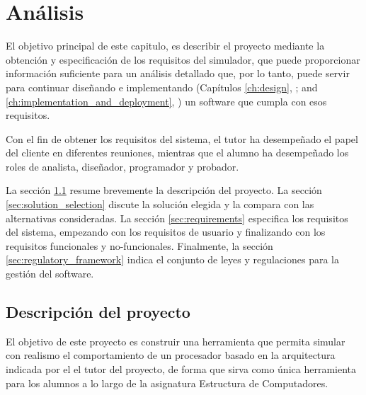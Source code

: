 \chead[]{}
\renewcommand{\headrulewidth}{0.5pt}

\lfoot[]{}
\cfoot[]{}
\rfoot[]{}
\renewcommand{\footrulewidth}{0pt}

\chapter{Análisis}
\label{ch:analysis}

El objetivo principal de este capitulo, es describir el proyecto mediante la obtención y especificación de los requisitos del simulador, que puede proporcionar información suficiente para un análisis detallado que, por lo tanto, puede servir para continuar diseñando e implementando (Capítulos \ref{ch:design}, \textit{}; and \ref{ch:implementation_and_deployment}, \textit{}) un software que cumpla con esos requisitos. 

Con el fin de obtener los requisitos del sistema, el tutor ha desempeñado el papel del cliente en diferentes reuniones, mientras que el alumno ha desempeñado los roles de analista, diseñador, programador y probador.

La sección \ref{sec:project_description} resume brevemente la descripción del proyecto. La sección \ref{sec:solution_selection} discute la solución elegida y la compara con las alternativas consideradas. La sección \ref{sec:requirements} especifica los requisitos del sistema, empezando con los requisitos de usuario y finalizando con los requisitos funcionales y no-funcionales. Finalmente, la sección \ref{sec:regulatory_framework} indica el conjunto de leyes y regulaciones para la gestión del software.  

\section{Descripción del proyecto}
\label{sec:project_description}

El objetivo de este proyecto es construir una herramienta que permita simular con realismo el comportamiento de un procesador basado en la arquitectura indicada por el el tutor del proyecto, de forma que sirva como única herramienta para los alumnos a lo largo de la asignatura Estructura de Computadores.

